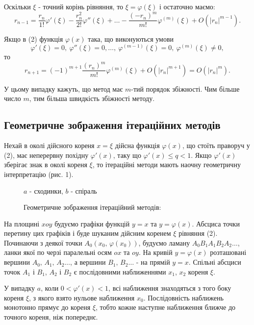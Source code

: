 \documentclass[14pt,a4paper,titlepage]{extarticle}
\begin{document}
Оскільки $\xi$ - точний корінь рівняння, то $\xi=\varphi(\xi)$ і остаточно маємо:
$$r_{n-1}=\frac{r_n}{1!}\varphi'(\xi)-\frac{r_n^2}{2!}\varphi''(\xi)+\ldots-\frac{(-r_n)^m}{m!}\varphi^{(m)}(\xi)+O\left(\left|r_n\right|^{m-1}\right).$$

Якщо в (2) функція $\varphi(x)$ така, що виконуються умови 
\begin{equation} 
\varphi'(\xi)=0,\ \varphi''(\xi)=0,\ldots,\ \varphi^{(m-1)}(\xi)=0,\ \varphi^{(m)}(\xi)\neq0,
\end{equation}
то
$$r_{n+1}=(-1)^{m+1}\frac{(r_n)^m}{m!}\varphi^{(m)}(\xi)+O\left(\left|r_n\right|^{m+1}\right)=O\left(\left|r_n\right|^m\right).$$

У цьому випадку кажуть, що метод має $m$-тий порядок збіжності. Чим більше число $m$, тим більша швидкість збіжності методу.

{\centering \subsection{Геометричне зображення ітераційних методів}}

Нехай в околі дійсного кореня $x=\xi$ дійсна функція $\varphi(x)$, що стоїть праворуч у (2), має неперервну похідну $\varphi'(x)$, таку що $\varphi'(x)\leqslant q<1$. Якщо $\varphi'(x)$ зберігає знак в околі кореня $\xi$, то ітераційні методи мають наочну геометричну інтерпретацію (рис. 1).

\begin{figure}[h]
\center{\texttt{[image: 2]}}
\caption{Геометричне зображення ітераційний методів:}
{$a$ - сходинки, $b$ - спіраль}
\end{figure}

На площині $xoy$ будуємо графіки функцій $y=x$ та $y=\varphi(x)$. Абсциса точки перетину цих графіків і буде шуканим дійсним коренем $\xi$ рівняння (2). Починаючи з деякої точки $A_0(x_0,\,\varphi(x_0))$, будуємо ламану $A_0B_1A_1B_2A_2\ldots$, ланки якої по черзі паралельні осям $ox$ та $oy$. На кривій $y=\varphi(x)$ розташовані вершини $A_0,\,A_1,\,A_2\ldots$, а вершини $B_1,\,B_2\ldots$ - на прямій $y=x$. Спільні абсциси точок $A_1$ і 
$B_1$, $A_2$ і $B_2$ є послідовними наближеннями $x_1$, $x_2$ кореня $\xi$.

У випадку $a$, коли $0<\varphi'(x)<1$, всі наближення знаходяться з того боку кореня $\xi$, з якого взято нульове наближення $x_0$. Послідовність наближень монотонно прямує до кореня $\xi$, тобто кожне наступне наближення ближче до точного кореня, ніж попереднє.
\end{document}
